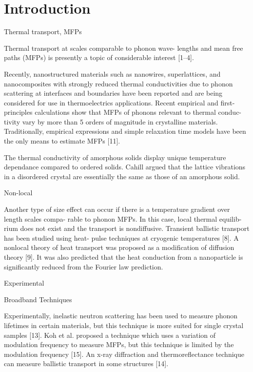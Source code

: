 \documentclass[aps,prb,twocolumn,superscriptaddress,footinbib,amsmath,amssymb,floatfix]{revtex4}
\begin{document}
\section{\label{S:Introduction}Introduction}

Thermal transport, MFPs

Thermal transport at scales comparable to phonon wave-
lengths and mean free paths (MFPs) is presently a topic of
considerable interest [1–4].\cite{cahill_nanoscale_2003,
yu_reduction_2010,hochbaum_enhanced_2008,pernot_precise_2010}

Recently, nanostructured materials
such as nanowires, superlattices, and nanocomposites with
strongly reduced thermal conductivities due to phonon
scattering at interfaces and boundaries have been reported
and are being considered for use in thermoelectrics applications.
\cite{hochbaum_enhanced_2008,pernot_precise_2010,
boukai_silicon_2008,poudel_high-thermoelectric_2008}
Recent empirical and first-principles calculations
show that MFPs of phonons relevant to thermal conduc-
tivity vary by more than 5 orders of magnitude in crystalline 
materials.\cite{ward_intrinsic_2010}
Traditionally, empirical expressions and
simple relaxation time models have been the only means
to estimate MFPs [11].\cite{holland_analysis_1963} 

The thermal conductivity of amorphous solids display 
unique temperature dependance compared to ordered solids.
\cite{freeman_thermal_1986} 
Cahill argued that the lattice vibrations 
in a disordered crystal are essentially the same as those of an 
amorphous solid.\cite{cahill_lower_1992} 

Non-local

Another type of size effect can occur if
there is a temperature gradient over length scales compa-
rable to phonon MFPs. In this case, local thermal equilib-
rium does not exist and the transport is nondiffusive.
Transient ballistic transport has been studied using heat-
pulse techniques at cryogenic temperatures [8].
\cite{von-Gutfeld_heat_1964} 
A nonlocal
theory of heat transport was proposed as a modification of
diffusion theory [9].\cite{mahan_nonlocal_1988} 
It was also predicted that the heat
conduction from a nanoparticle is significantly reduced
from the Fourier law prediction.\cite{chen_particularities_2000}

Experimental

Broadband Techniques

Experimentally, inelastic neutron scattering has been
used to measure phonon lifetimes in certain materials,
but this technique is more suited for single crystal samples
[13].\cite{christianson_phonon_2008} 
Koh et al. proposed a technique which uses a variation of
modulation frequency to measure MFPs, but this technique
is limited by the modulation frequency [15].
\cite{koh_frequency_2007}
An x-ray diffraction and thermoreflectance technique
can measure ballistic transport in some structures [14].
\cite{highland_ballistic-phonon_2007}
\end{document}
